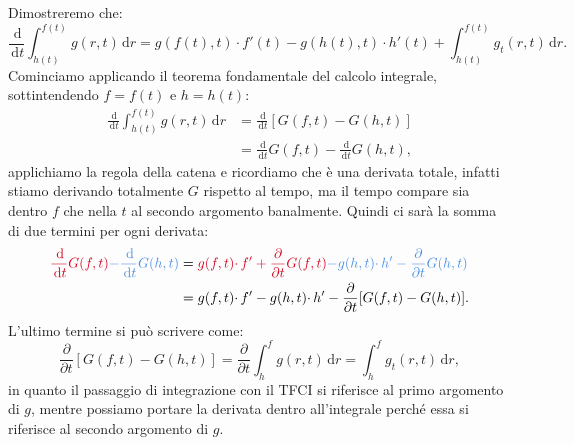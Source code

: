 \documentclass[10pt,a4paper,twoside,openright]{book}
\newcommand{\de}{\,\mathrm d}
\newcommand{\dr}{\de r}
\newcommand{\dt}{\de t}
\begin{document}
\begin{nb}
    Dimostreremo che:
    \begin{equation*}
        \frac{\de}{\dt}\int _{h(t)}^{f(t)} g(r,t) \dr=g(f(t) ,t) \cdotp f'(t) -g(h(t) ,t) \cdotp h'(t) +\int _{h(t)}^{f(t)} g_{t}(r,t) \dr.
    \end{equation*}
    Cominciamo applicando il teorema fondamentale del calcolo integrale, sottintendendo $f=f(t)$ e $h=h(t)$:
    \begin{align*}
        \frac{\de}{\dt}\int _{h(t)}^{f(t)} g(r,t) \dr & =\frac{\de}{\dt}[ G(f,t) -G(h,t)]                 \\
                                                      & =\frac{\de}{\dt} G(f,t) -\frac{\de}{\dt} G(h,t) ,
    \end{align*}
    applichiamo la regola della catena e ricordiamo che è una derivata totale, infatti stiamo derivando totalmente $G$ rispetto al tempo, ma il tempo compare sia dentro $f$ che nella $t$ al secondo argomento banalmente. Quindi ci sarà la somma di due termini per ogni derivata:
    \begin{align*}
        \textcolor[rgb]{0.82,0.01,0.11}{\frac{\de}{\dt} G(f,t)}\textcolor[rgb]{0.29,0.56,0.89}{-\frac{\de}{\dt} G(h,t)} & =\textcolor[rgb]{0.82,0.01,0.11}{g(f,t) \cdotp f'+\frac{\partial }{\partial t} G(f,t)}\textcolor[rgb]{0.29,0.56,0.89}{-g(h,t) \cdotp h'-\frac{\partial }{\partial t} G(h,t)} \\
                                                                                                                        & =g(f,t) \cdotp f'-g(h,t) \cdotp h'-\frac{\partial }{\partial t}[ G(f,t) -G(h,t)] .
    \end{align*}
    L'ultimo termine si può scrivere come:
    \begin{equation*}
        \frac{\partial }{\partial t}[ G(f,t) -G(h,t)] =\frac{\partial }{\partial t}\int _{h}^{f} g(r,t) \dr=\int _{h}^{f} g_{t}(r,t) \dr,
    \end{equation*}
    in quanto il passaggio di integrazione con il TFCI si riferisce al primo argomento di $g$, mentre possiamo portare la derivata dentro all'integrale perché essa si riferisce al secondo argomento di $g$.
\end{nb}
\end{document}

